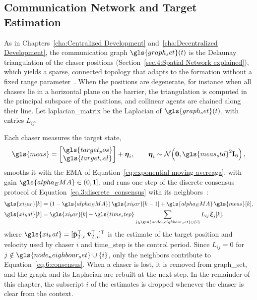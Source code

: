 \subsection{Communication Network and Target Estimation} \label{sec.6:estimation}

As in Chapters~\ref{cha:Centralized Development} and~\ref{cha:Decentralized Development}, the communication graph $\gls{graph_set}(t)$ is the Delaunay triangulation of the chaser positions (Section~\ref{sec.4:Spatial Network explained}), which yields a sparse, connected topology that adapts to the formation without a fixed range parameter~\cite{cortesRobustRendezvousMobile2006}. When the positions are degenerate, for instance when all chasers lie in a horizontal plane on the barrier, the triangulation is computed in the principal subspace of the positions, and collinear agents are chained along their line. Let \gls{laplacian_matrix} be the Laplacian of $\gls{graph_set}(t)$, with entries $L_{ij}$.

Each chaser measures the target state,
\begin{equation}
    \gls{meas}=\begin{bmatrix}\gls{target_pos}\\ \gls{target_vel}\end{bmatrix}+\boldsymbol{\eta}_i,
    \qquad
    \boldsymbol{\eta}_i\sim\mathcal{N}\!\left(\mathbf{0},\gls{meas_std}^2\mathbf{I}_6\right),
\end{equation}
smooths it with the \gls{EMA} of Equation~\eqref{eq:exponential moving avereaga}, with gain $\gls{alpha_EMA}\in(0,1]$, and runs one step of the discrete consensus protocol of Equation~\eqref{eq.3:discrete_consensus} with its neighbors~\cite{olfati-saberConsensusCooperationNetworked2007}:
\begin{align}
    \gls{xi_bar}[k] &= (1-\gls{alpha_EMA})\,\gls{xi_bar}[k-1] + \gls{alpha_EMA}\,\gls{meas}[k], \label{eq.6:ema}\\
    \gls{xi_hat}[k] &= \gls{xi_bar}[k] - \gls{time_step}\sum_{j\in\gls{node_neighbour_set}\cup\{i\}} L_{ij}\,\bar{\boldsymbol{\xi}}_j[k], \label{eq.6:consensus}
\end{align}
where $\gls{xi_hat}=[\hat{\mathbf{p}}_{T,i}^{\mathsf T}\;\hat{\mathbf{v}}_{T,i}^{\mathsf T}]^{\mathsf T}$ is the estimate of the target position and velocity used by chaser $i$ and \gls{time_step} is the control period. Since $L_{ij}=0$ for $j\notin\gls{node_neighbour_set}\cup\{i\}$, only the neighbors contribute to Equation~\eqref{eq.6:consensus}. When a chaser is lost, it is removed from \gls{graph_set}, and the graph and its Laplacian are rebuilt at the next step. In the remainder of this chapter, the subscript $i$ of the estimates is dropped whenever the chaser is clear from the context.

